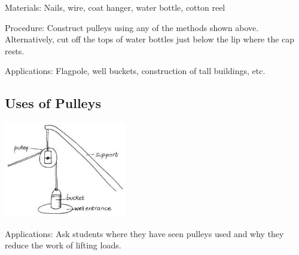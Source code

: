 \begin{multicols}{2}
\begin{description*}
\item[Materials:]{Nails, wire, coat hanger, water bottle, cotton reel}
\item[Procedure:]{Construct pulleys using any of the methods shown above. Alternatively, cut off the tops of water bottles just below the lip where the cap rests.}
\item[Applications:]{Flagpole, well buckets, construction of tall buildings, etc.}
\end{description*}

\subsection{Uses of Pulleys}

\begin{center}
\includegraphics[width=0.4\textwidth]{./img/vso/uses-pulleys.jpg}
\end{center}

\begin{description*}
\item[Applications:]{Ask students where they have
seen pulleys used and why they
reduce the work of lifting loads.}
\end{description*}


\end{multicols}
